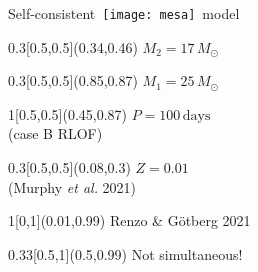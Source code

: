 \documentclass[xcolor=dvipsnames,professionalfonts, aspectratio=169]{beamer}
\begin{document}
\bgroup
{}
\begin{frame}{\textcolor{white!80!Yellow}{Self-consistent}~\texttt{[image: mesa]}~\textcolor{white!80!Yellow}{model}}


  \begin{textblock}{0.3}[0.5,0.5](0.34,0.46)
    \textcolor{white!80!Yellow}{$M_2=17\,M_\odot$}
  \end{textblock}

  \begin{textblock}{0.3}[0.5,0.5](0.85,0.87)
    \textcolor{white!80!Yellow}{$M_1=25\,M_\odot$}
  \end{textblock}

  \begin{textblock}{1}[0.5,0.5](0.45,0.87)
    \centering
    \textcolor{white!80!Yellow}{$P=100\,\mathrm{days}$}\\[2pt]
    \textcolor{gray!50}{\small (case B RLOF)}
  \end{textblock}



  \begin{textblock}{0.3}[0.5,0.5](0.08,0.3)
    \centering
    \textcolor{white!80!Yellow}{$Z=0.01$}\\
    \textcolor{gray!50}{\tiny (Murphy \emph{et al.} 2021)}
  \end{textblock}

  \begin{textblock}{1}[0,1](0.01,0.99)
    \textcolor{gray!50}{\tiny Renzo \& G\"otberg 2021}\,
  \end{textblock}
\end{frame}
\egroup

\bgroup
{}
\begin{frame}[plain]

  \begin{textblock}{0.33}[0.5,1](0.5,0.99)
    \centering
    \textcolor{gray!50}{\tiny Not simultaneous!}
  \end{textblock}
\end{frame}
\egroup
\end{document}
